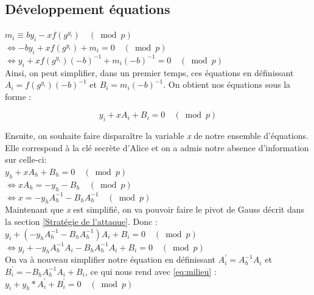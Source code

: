 \documentclass{backend}
\begin{document}
\newpage
\subsection{Développement équations}\label{annexe:Developpement}

$ m_{i} \equiv b y_{i}-x f\left(g^{y_{i}}\right) \quad(\bmod p)$  \\
$ \Leftrightarrow -b y_{i}+x f\left(g^{y_{i}}\right) + m_{i} = 0 \quad(\bmod p)$\\
$ \Leftrightarrow y_{i}+x f\left(g^{y_{i}}\right) (-b)^{-1} + m_{i}(-b)^{-1} = 0 \quad(\bmod p)$\\

Ainsi, on peut simplifier, dans un premier temps,  ces équations en définissant $ A_{i} =  f\left(g^{y_{i}}\right) (-b)^{-1}$ et $ B_{i} = m_{i}(-b)^{-1}$. On obtient nos équations sous la forme :

$$ y_{i}+x A_{i} + B_{i} = 0 \quad(\bmod p)$$

Ensuite, on souhaite faire disparaître la variable \textit{x} de notre ensemble d'équations. Elle correspond à la clé secrète d'Alice et on a admis notre absence d'information sur celle-ci: \\
$ y_{h}+x A_{h} + B_{h} = 0 \quad(\bmod p)$\\
$ \Leftrightarrow x A_{h}= -y_{h} - B_{h} \quad(\bmod p)$\\
$ \Leftrightarrow x = -y_{h}A_{h}^{-1} - B_{h}A_{h}^{-1} \quad(\bmod p)$\\

Maintenant que \textit{x} est simplifié, on va pouvoir faire le pivot de Gauss décrit dans la section \ref{Stratégie de l'attaque}.
Donc : \\$ y_{i}+(-y_{h}A_{h}^{-1} - B_{h}A_{h}^{-1})A_{i} + B_{i} = 0 \quad(\bmod p)$\\
$ \Leftrightarrow y_{i}+-y_{h}A_{h}^{-1}A_{i} - B_{h}A_{h}^{-1}A_{i} + B_{i} = 0 \quad(\bmod p)$\\
On va à nouveau simplifier notre équation en définissant $ A^{\prime}_{i} = A_{h}^{-1}A_{i}$ et $ B^{\prime}_{i} = - B_{h}A_{h}^{-1}A_{i} + B_{i} $, ce qui nous rend avec \ref{eq:milieu} : $y_{i} + y_{h} * A^{\prime}_{i} + B^{\prime}_{i} = 0 \quad(\bmod p)$\\
\end{document}
